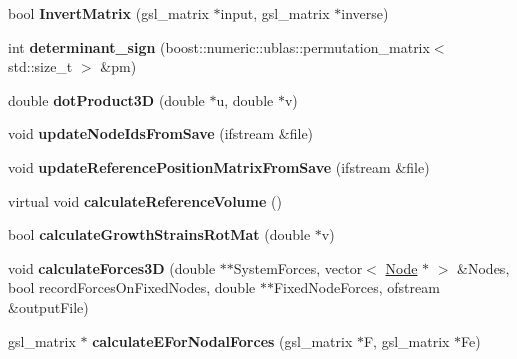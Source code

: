 \begin{DoxyCompactItemize}
\item 
\hypertarget{classShapeBase_ab0a890c07a2fa8ac45fa50bdbfe6b0d9}{}bool {\bfseries Invert\+Matrix} (gsl\+\_\+matrix $\ast$input, gsl\+\_\+matrix $\ast$inverse)\label{classShapeBase_ab0a890c07a2fa8ac45fa50bdbfe6b0d9}

\item 
\hypertarget{classShapeBase_a82fc62813dedf48bf3074206a26c3dfd}{}int {\bfseries determinant\+\_\+sign} (boost\+::numeric\+::ublas\+::permutation\+\_\+matrix$<$ std\+::size\+\_\+t $>$ \&pm)\label{classShapeBase_a82fc62813dedf48bf3074206a26c3dfd}

\item 
\hypertarget{classShapeBase_a6b58642f88a23bd984d7af48cbd4f95a}{}double {\bfseries dot\+Product3\+D} (double $\ast$u, double $\ast$v)\label{classShapeBase_a6b58642f88a23bd984d7af48cbd4f95a}

\item 
\hypertarget{classShapeBase_ac4c46ba7c9b89a208fafb419097494a5}{}void {\bfseries update\+Node\+Ids\+From\+Save} (ifstream \&file)\label{classShapeBase_ac4c46ba7c9b89a208fafb419097494a5}

\item 
\hypertarget{classShapeBase_a4b5cade90773535353e9b7c4da3463ae}{}void {\bfseries update\+Reference\+Position\+Matrix\+From\+Save} (ifstream \&file)\label{classShapeBase_a4b5cade90773535353e9b7c4da3463ae}

\item 
\hypertarget{classShapeBase_a39adc8589779388b57622489f370f445}{}virtual void {\bfseries calculate\+Reference\+Volume} ()\label{classShapeBase_a39adc8589779388b57622489f370f445}

\item 
\hypertarget{classShapeBase_a8bf9c7c8ae6a3195ec9c6b6bdaf847ab}{}bool {\bfseries calculate\+Growth\+Strains\+Rot\+Mat} (double $\ast$v)\label{classShapeBase_a8bf9c7c8ae6a3195ec9c6b6bdaf847ab}

\item 
\hypertarget{classShapeBase_acbe7dfe60cdac63414879ea0e0d0fc2f}{}void {\bfseries calculate\+Forces3\+D} (double $\ast$$\ast$System\+Forces, vector$<$ \hyperlink{classNode}{Node} $\ast$ $>$ \&Nodes, bool record\+Forces\+On\+Fixed\+Nodes, double $\ast$$\ast$Fixed\+Node\+Forces, ofstream \&output\+File)\label{classShapeBase_acbe7dfe60cdac63414879ea0e0d0fc2f}

\item 
\hypertarget{classShapeBase_a311e773cb7bf7c410c39026d7183b4ad}{}gsl\+\_\+matrix $\ast$ {\bfseries calculate\+E\+For\+Nodal\+Forces} (gsl\+\_\+matrix $\ast$F, gsl\+\_\+matrix $\ast$Fe)\label{classShapeBase_a311e773cb7bf7c410c39026d7183b4ad}


\end{DoxyCompactItemize}

